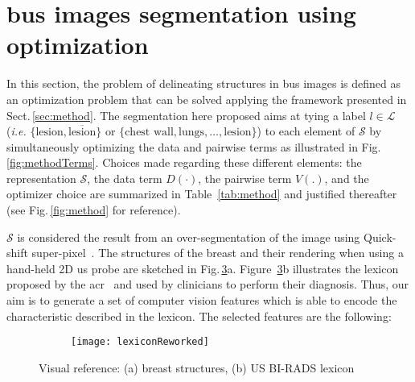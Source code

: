 \section{\ac{bus} images segmentation using optimization}\label{sec:methodApp}
In this section, the problem of delineating structures in \ac{bus} images is defined as an optimization problem that can be solved applying the framework presented in Sect.\,\ref{sec:method}.
The segmentation here proposed aims at tying a label $l\in\mathcal{L}$ (\emph{i.e.} $\{\text{lesion}, \overline{\text{lesion}}\}$ or $\{ \text{chest wall}, \text{lungs}, \dots, \text{lesion} \}$) to each element of $\mathcal{S}$ by simultaneously optimizing the data and pairwise terms as illustrated in Fig.\,\ref{fig:methodTerms}.
Choices made regarding these different elements:
the representation $\mathcal{S}$, the data term $D(\cdot)$, the pairwise term $V(.)$, and the optimizer choice are summarized in Table~\ref{tab:method} and justified thereafter (see Fig.\,\ref{fig:method} for reference).

$\mathcal{S}$ is considered the result from an over-segmentation of the image using Quick-shift super-pixel~\cite{achanta2012slic}. 
The structures of the breast and their rendering when using a hand-held 2D \ac{us} probe are sketched in Fig.\,\ref{fig:features}a. Figure~\ref{fig:features}b illustrates the lexicon proposed by the \ac{acr}~\cite{biradsus} and used by clinicians to perform their diagnosis. Thus, our aim is to generate a set of computer vision features which is able to encode the characteristic described in the lexicon. 
The selected features are the following:

\begin{figure}[t]
    \centering
    \begin{subfigure}[b]{0.30\textwidth}
        \centering
        \label{fig:features:breast}
    \end{subfigure}
    \hfill
    \begin{subfigure}[b]{0.65\textwidth}   
        \centering 
        \texttt{[image: lexiconReworked]}
        \label{fig:features:lexicon}
    \end{subfigure}
    \hfill
    \caption {{\footnotesize Visual reference: (a) breast structures, (b) US BI-RADS lexicon}} 
    \label{fig:features}
\end{figure}

